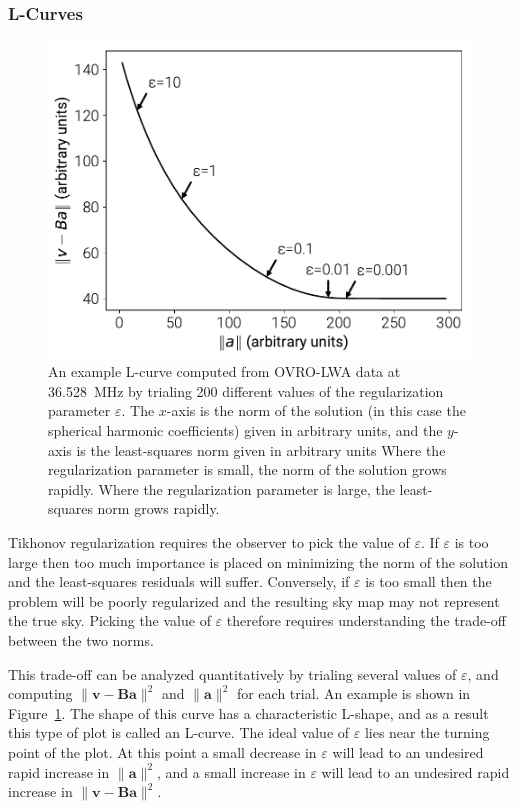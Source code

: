 \documentclass[twocolumn]{aastex61}
\renewcommand{\b}{\pmb}
\begin{document}
\subsubsection{L-Curves}

\begin{figure}[t]
    \includegraphics[width=\columnwidth]{figures/lcurve/lcurve}
    \caption{
        An example L-curve computed from OVRO-LWA data at 36.528~MHz by trialing 200 different
        values of the regularization parameter $\varepsilon$. The $x$-axis is the norm of the
        solution (in this case the spherical harmonic coefficients) given in arbitrary units, and
        the $y$-axis is the least-squares norm given in arbitrary units Where the regularization
        parameter is small, the norm of the solution grows rapidly. Where the regularization
        parameter is large, the least-squares norm grows rapidly.
    }
    \label{fig:lcurve}
\end{figure}

Tikhonov regularization requires the observer to pick the value of $\varepsilon$. If $\varepsilon$
is too large then too much importance is placed on minimizing the norm of the solution and the
least-squares residuals will suffer. Conversely, if $\varepsilon$ is too small then the problem will
be poorly regularized and the resulting sky map may not represent the true sky. Picking the value of
$\varepsilon$ therefore requires understanding the trade-off between the two norms.

This trade-off can be analyzed quantitatively by trialing several values of $\varepsilon$, and
computing $\|\b v - \b B\b a\|^2$ and $\|\b a\|^2$ for each trial. An example is shown in
Figure~\ref{fig:lcurve}. The shape of this curve has a characteristic L-shape, and as a result this
type of plot is called an L-curve. The ideal value of $\varepsilon$ lies near the turning point of
the plot. At this point a small decrease in $\varepsilon$ will lead to an undesired rapid increase
in $\|\b a\|^2$, and a small increase in $\varepsilon$ will lead to an undesired rapid increase in
$\|\b v - \b B\b a\|^2$.
\end{document}
